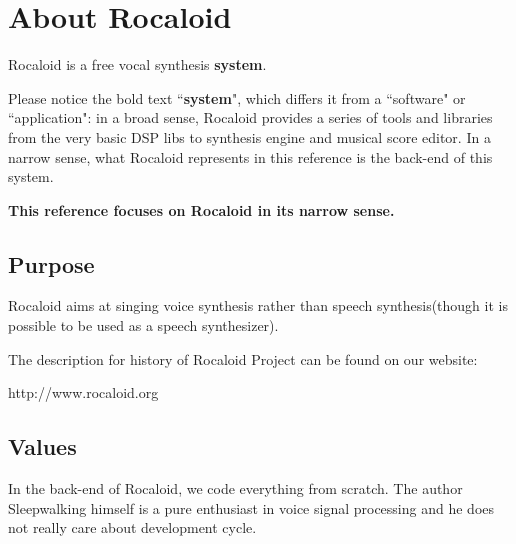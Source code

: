 \section{About Rocaloid}\indent

        Rocaloid is a free vocal synthesis \textbf{system}.
        
        Please notice the bold text ``\textbf{system}", which differs it from a ``software" or ``application": in a broad sense, Rocaloid provides a series of tools and libraries from the very basic DSP libs to synthesis engine and musical score editor. In a narrow sense, what Rocaloid represents in this reference is the back-end of this system.
        
        \bigskip
        
        \textbf{This reference focuses on Rocaloid in its narrow sense.}
        
        \bigskip

\subsection{Purpose}\indent

        Rocaloid aims at singing voice synthesis rather than speech synthesis(though it is possible to be used as a speech synthesizer).
        
        The description for history of Rocaloid Project can be found on our website:
        
        http://www.rocaloid.org
        
\subsection{Values}\indent

        In the back-end of Rocaloid, we code everything from scratch. The author Sleepwalking himself is a pure enthusiast in voice signal processing and he does not really care about development cycle.

